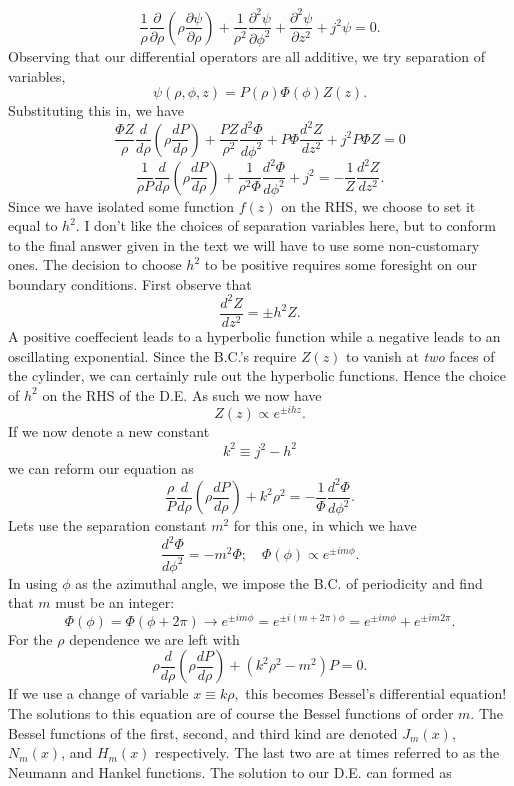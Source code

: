 \documentclass[11pt,letterpaper]{article}
\begin{document}
\begin{enumerate}
\begin{enumerate}
$$\frac 1\rho \frac{\partial}{\partial \rho}\left(\rho\frac{\partial \psi}{\partial\rho}\right)+\frac{1}{\rho^2}\frac{\partial^2\psi}{\partial\phi^2}+\frac{\partial^2\psi}{\partial z^2}+j^2\psi = 0.$$
Observing that our differential operators are all additive, we try separation of variables,
$$\psi(\rho,\phi,z) = P(\rho)\Phi(\phi)Z(z).$$
Substituting this in, we have
$$\frac {\Phi Z}{\rho} \frac{d}{d \rho}\left(\rho\frac{dP}{d\rho}\right)+\frac{PZ}{\rho^2}\frac{d^2\Phi}{d\phi^2}+P\Phi\frac{d^2Z}{dz^2}+j^2P\Phi Z = 0$$
$$\frac{1}{\rho P}\frac{d}{d\rho}\left(\rho\frac{dP}{d\rho}\right)+\frac{1}{\rho^2\Phi}\frac{d^2\Phi}{d\phi^2}+j^2 = -\frac{1}{Z}\frac{d^2Z}{dz^2}.$$
Since we have isolated some function $f(z)$ on the RHS, we choose to set it equal to $h^2$. I don't like the choices of separation variables here, but to conform to the final answer given in the text we will have to use some non-customary ones. The decision to choose $h^2$ to be positive requires some foresight on our boundary conditions. First observe that 
$$\frac{d^2Z}{dz^2} = \pm h^2Z.$$
A positive coeffecient leads to a hyperbolic function while a negative leads to an oscillating exponential. Since the B.C.'s require $Z(z)$ to vanish at \emph{two} faces of the cylinder, we can certainly rule out the hyperbolic functions. Hence the choice of $h^2$ on the RHS of the D.E. As such we now have
$$Z(z)\propto e^{\pm ihz}.$$
If we now denote a new constant 
$$k^2\equiv j^2-h^2$$
we can reform our equation as
$$\frac{\rho}{P}\frac{d}{d\rho}\left(\rho\frac{dP}{d\rho}\right)+k^2\rho^2 = -\frac{1}{\Phi}\frac{d^2\Phi}{d\phi^2}.$$
Lets use the separation constant $m^2$ for this one, in which we have
$$\frac{d^2\Phi}{d\phi^2} = -m^2\Phi;\quad\Phi(\phi)\propto e^{\pm im\phi}.$$
In using $\phi$ as the azimuthal angle, we impose the B.C. of periodicity and find that $m$ must be an integer:
$$\Phi(\phi) = \Phi(\phi+2\pi)\rightarrow e^{\pm im\phi}=e^{\pm i(m+2\pi)\phi} = e^{\pm im\phi}+e^{\pm im2\pi}.$$
For the $\rho$ dependence we are left with 
\begin{equation}\label{bde}\rho\frac{d}{d\rho}\left(\rho\frac{dP}{d\rho}\right)+(k^2\rho^2-m^2)P = 0.
\end{equation}
If we use a change of variable $x\equiv k\rho,$ this becomes Bessel's differential equation! The solutions to this equation are of course the Bessel functions of order $m$. The Bessel functions of the first, second, and third kind are denoted $J_m(x)$, $N_m(x)$, and $H_m(x)$ respectively. The last two are at times referred to as the Neumann and Hankel functions. The solution to our D.E. can formed as 

\end{enumerate}
\end{enumerate}
\end{document}
